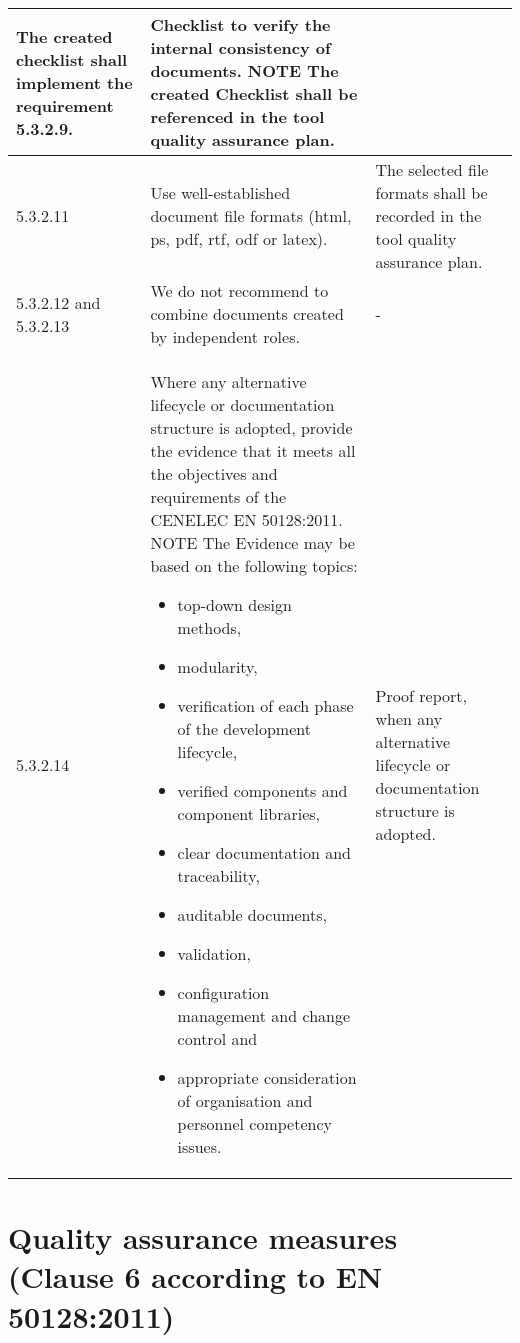 \documentclass{template/openetcs_report}
\begin{document}
{\begin{longtable}{|p{2cm}|p{9cm}|p{3cm}|}
The created checklist shall implement the requirement 5.3.2.9.
& Checklist to verify the internal consistency of documents.
\linebreak
\linebreak
NOTE\linebreak
The created Checklist shall be referenced in the tool quality assurance plan.\\ 
\hline
5.3.2.11 & Use well-established document file formats (html, ps, pdf, rtf, odf or latex).
& The selected file formats shall be recorded in the tool quality assurance plan.\\ 
\hline
5.3.2.12 and 5.3.2.13 & We do not recommend to combine documents created by independent roles. 
& - \\ 
\hline
5.3.2.14 & Where any alternative lifecycle or documentation structure is adopted, provide the evidence that it meets all the objectives and requirements of the CENELEC EN 50128:2011.
\linebreak
\linebreak
NOTE\linebreak
The Evidence may be based on the following topics:
\begin{itemize}\itemsep=0pt
  \item top-down design methods,
  \item modularity,
  \item verification of each phase of the development lifecycle,
  \item verified components and component libraries,
  \item clear documentation and traceability,
  \item auditable documents,
  \item validation,
  \item configuration management and change control and
  \item appropriate consideration of organisation and personnel competency issues.
\end{itemize}
& Proof report, when any alternative lifecycle or documentation structure is adopted.\\ 
\hline
\end{longtable}}



\section{Quality assurance measures (Clause 6 according to EN 50128:2011)}
\label{clause6}
\end{document}
